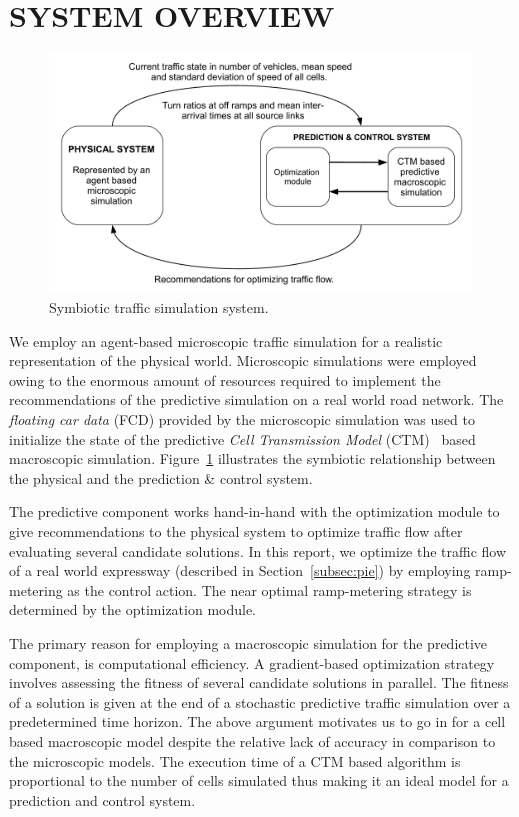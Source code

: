 \documentclass[12pt]{article}
\begin{document}
\section{SYSTEM OVERVIEW}
\label{sec:sts}
\begin{figure}[!htbp]
    \centering
    \includegraphics[scale=0.42]{images/methodology.pdf}

    \caption{Symbiotic traffic simulation system.}
    \label{fig:sts-platform}
  \end{figure}

We employ an agent-based microscopic traffic simulation for a realistic representation of the physical world. Microscopic simulations were employed owing to the enormous amount of resources required to implement the recommendations of the predictive simulation on a real world road network. The {\it floating car data} (FCD) provided by the microscopic simulation was used to initialize the state of the predictive {\it Cell Transmission Model} (CTM)~\cite{daganzo1994cell} based macroscopic simulation.  Figure~\ref{fig:sts-platform} illustrates the symbiotic relationship between the physical and the prediction \& control system. 

The predictive component works hand-in-hand with the optimization module to give  recommendations to the physical system to optimize traffic flow after evaluating several candidate solutions. In this report, we optimize the traffic flow of a real world expressway (described in Section~\ref{subsec:pie}) by employing ramp-metering as the control action. The near optimal ramp-metering strategy is determined by the optimization module.

The primary reason for employing a macroscopic simulation for the predictive component, is computational efficiency. A gradient-based optimization strategy involves assessing the fitness of several candidate solutions in parallel. The fitness of a solution is given at the end of a stochastic predictive traffic simulation over a predetermined time horizon.  The above argument motivates us to go in for a cell based macroscopic model despite the relative lack of accuracy in comparison to the microscopic models. The execution time of a CTM based algorithm is proportional to the number of cells simulated thus making it an ideal model for a prediction and control system.
\end{document}
